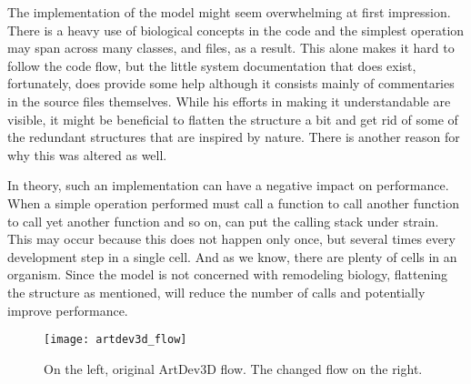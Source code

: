 The implementation of the model might seem overwhelming at first impression. There is a heavy use of biological concepts in the code and the simplest operation may span across many classes, and files, as a result. This alone makes it hard to follow the code flow, but the little system documentation that does exist, fortunately, does provide some help although it consists mainly of commentaries in the source files themselves. While his efforts in making it understandable are visible, it might be beneficial to flatten the structure a bit and get rid of some of the redundant structures that are inspired by nature. There is another reason for why this was altered as well.

In theory, such an implementation can have a negative impact on performance. When a simple operation performed must call a function to call another function to call yet another function and so on, can put the calling stack under strain. This may occur because this does not happen only once, but several times every development step in a single cell. And as we know, there are plenty of cells in an organism. Since the model is not concerned with remodeling biology, flattening the structure as mentioned, will reduce the number of calls and potentially improve performance.

\begin{figure}[!ht]
	\centering
	\texttt{[image: artdev3d\_flow]}
	\caption{On the left, original ArtDev3D flow. The changed flow on the right.}
	\label{fig:artdev3d_flow}
\end{figure}

